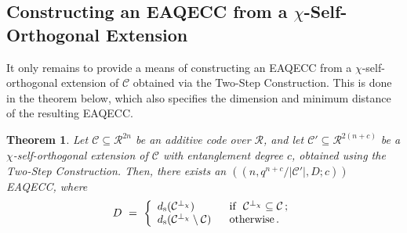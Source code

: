 \documentclass{article}
\newtheorem{thm}{Theorem}[section]
\theoremstyle{remark}
\theoremstyle{definition}
\numberwithin{equation}{section}
\begin{document}
\subsection{Constructing an EAQECC from a $\chi$-Self-Orthogonal Extension}
It only remains to provide a means of constructing an EAQECC from a $\chi$-self-orthogonal extension of $\mathcal{C}$ obtained via the Two-Step Construction. This is done in the theorem below, which also specifies the dimension and minimum distance of the resulting EAQECC.
 
\begin{thm}\label{thm:eaqecc}
Let $\mathcal{C} \subseteq \mathcal{R}^{2n}$ be an additive code over $\mathcal R$,  and let $\mathcal{C}' \subseteq \mathcal{R}^{2(n+c)}$ be a $\chi$-self-orthogonal extension of $\mathcal{C}$ with entanglement degree $c$, obtained using the Two-Step Construction. Then, there  exists an $((n,q^{n+c}/{|\mathcal{C}'|} ,D;c))$ EAQECC,  where
\begin{equation*}D~=~\left\{\begin{array}{ll}
 d_{\mathrm{s}}(\mathcal{C}^{\perp_\chi}) & \text{~~if~~} \mathcal{C}^{\perp_\chi}\subseteq \mathcal{C}\, ;\\
d_{\mathrm{s}}(\mathcal{C}^{\perp_\chi}\setminus \mathcal{C} )  & \text{~~otherwise} \,.
\end{array}\right. \vspace{-1mm}\end{equation*}
\end{thm}
\end{document}
